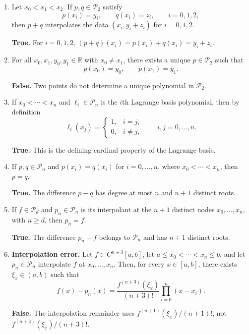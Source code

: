 \documentclass[a4paper]{article}
\newcommand{\answer}[1]{%
    \ifdefined\showsolutions
        \par\smallskip
        {\small\color{blue!60!black}#1\par}
    \fi
}
\begin{document}
\begin{enumerate}

    \item
        Let $x_0<x_1<x_2$. If $p,q\in\mathcal P_2$ satisfy
        \[
            p(x_i)=y_i,\qquad q(x_i)=z_i,\qquad i=0,1,2,
        \]
        then $p+q$ interpolates the data $(x_i,y_i+z_i)$ for $i=0,1,2$.
        \answer{\textbf{True.}
        For $i=0,1,2$, $(p+q)(x_i)=p(x_i)+q(x_i)=y_i+z_i$.}

    \item
        For all $x_0,x_1,y_0,y_1\in\mathbb R$ with $x_0\ne x_1$, there exists a unique
        $p\in\mathcal P_2$ such that
        \[
            p(x_0)=y_0,\qquad p(x_1)=y_1.
        \]
        \answer{\textbf{False.}
        Two points do not determine a unique polynomial in $\mathcal P_2$.}

    \item
        If $x_0<\dotsb<x_n$ and $\ell_i\in\mathcal P_n$ is the $i$th Lagrange basis polynomial,
        then by definition
        \[
            \ell_i(x_j)=
            \begin{cases}
                1, & i=j,\\
                0, & i\ne j,
            \end{cases}
            \qquad i,j=0,\dotsc,n.
        \]
        \answer{\textbf{True.}
        This is the defining cardinal property of the Lagrange basis.}

    \item
        If $p,q\in\mathcal P_n$ and $p(x_i)=q(x_i)$ for $i=0,\dotsc,n$, where
        $x_0<\dotsb<x_n$, then $p=q$.
        \answer{\textbf{True.}
        The difference $p-q$ has degree at most $n$ and $n+1$ distinct roots.}

    \item
        If $f\in\mathcal P_d$ and $p_n\in\mathcal P_n$ is its interpolant at the $n+1$
        distinct nodes $x_0,\dotsc,x_n$, with $n\geq d$, then $p_n=f$.
        \answer{\textbf{True.}
        The difference $p_n-f$ belongs to $\mathcal P_n$ and has $n+1$ distinct roots.}

    \item
        \textbf{Interpolation error.}
        Let $f\in C^{n+3}[a,b]$, let $a\leq x_0<\dotsb<x_n\leq b$, and let
        $p_n\in\mathcal P_n$ interpolate $f$ at $x_0,\dotsc,x_n$. Then, for every
        $x\in[a,b]$, there exists $\xi_x\in(a,b)$ such that
        \[
            f(x)-p_n(x)=
            \frac{f^{(n+3)}(\xi_x)}{(n+3)!}\prod_{i=0}^{n}(x-x_i).
        \]
        \answer{\textbf{False.}
        The interpolation remainder uses $f^{(n+1)}(\xi_x)/(n+1)!$, not
        $f^{(n+3)}(\xi_x)/(n+3)!$.}


\end{enumerate}
\end{document}
